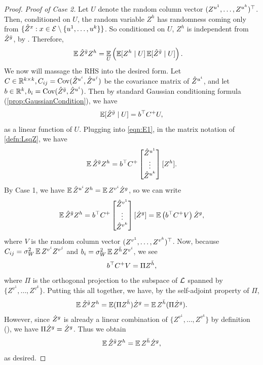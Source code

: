 \documentclass[main.tex]{subfiles}
\begin{document}
\begin{proof}
  \emph{Proof of Case 2.}
  Let $U$ denote the random column vector $(Z^{u^1}, \ldots, Z^{u^k})^\top$.
  Then, conditioned on $U$, the random variable $Z^h$ has randomness coming only from $\{\hat Z^x: x \in \mathcal{E} \setminus \{u^1, \ldots, u^k\}\}$.
  So conditioned on $U$, $Z^h$ is independent from $\hat Z^{\bar g}$, by .
  Therefore,
  \begin{align}
    \EV \Zhat^{\bar g} Z^h
    &=
      \EV_{U}\lp
      \EV [ Z^h \mid U]
      \EV [ \Zhat^{\bar g} \mid U]
      \rp
      .  \label{eqn:E1}
  \end{align}
  We now will massage the RHS into the desired form.
  Let $C \in \mathbb{R}^{k\times k}, C_{ij} = \operatorname{Cov}(\hat Z^{u^i}, \hat Z^{u^j})$ be the covariance matrix of $\hat Z^{u^i}$, and let $b \in \mathbb{R}^k, b_i = \operatorname{Cov}(\hat Z^{\bar g}, \hat Z^{u^i})$.
  Then by standard Gaussian conditioning formula (\cref{prop:GaussianCondition}), we have
  \begin{align*}
    \operatorname*{\mathbb{E}} [ \hat Z^{\bar g} \mid U] = b^\top C^+ U,
  \end{align*}
  as a linear function of $U$.
  Plugging into \cref{eqn:E1}, in the matrix notation of \cref{defn:LsqZ}, we have
  \begin{align*}
    \operatorname*{\mathbb{E}} \hat Z^{\bar g} Z^h = b^\top C^+ 
    \begin{bmatrix}
    \hat Z^{u^1}\\
    \vdots\\
    \hat Z^{u^k}
    \end{bmatrix}
    [Z^{h}]
    .
  \end{align*}
  By Case 1, we have $\operatorname*{\mathbb{E}} \hat Z^{u^{i}} Z^{h} = \operatorname*{\mathbb{E}} Z^{v^{i}} \dot Z^{g}$, so we can write
  \begin{align*}
    \operatorname*{\mathbb{E}} \hat Z^{\bar g} Z^h = b^\top C^+ 
    \begin{bmatrix}
    \hat Z^{v^1}\\
    \vdots\\
    \hat Z^{v^k}
    \end{bmatrix}
    [\dot Z^{g}]
    = \operatorname*{\mathbb{E}} \left( b^\top C^+ V \right) \dot Z^g
    ,
  \end{align*}
  where $V$ is the random column vector $(Z^{v^1}, \ldots, Z^{v^k})^\top$.
  Now, because $C_{ij} = \sigma_W^2 \operatorname*{\mathbb{E}} Z^{v^i} Z^{v^j}$ and $b_i = \sigma_W^2 \operatorname*{\mathbb{E}} Z^{\bar h} Z^{v^i}$, we see
  \[b^\top C^+ V
  = \Pi Z^{\bar h},\]
  where $\Pi$ is the orthogonal projection to the subspace of $\mathcal{L}$ spanned by $\{Z^{v^1}, \ldots, Z^{v^k}\}$.
  Putting this all together, we have, by the self-adjoint property of $\Pi$,
  \begin{align*}
    \operatorname*{\mathbb{E}} \hat Z^{\bar g} Z^h = \operatorname*{\mathbb{E}} (\Pi Z^{\bar h}) \dot Z^g = \operatorname*{\mathbb{E}} Z^{\bar h} (\Pi \dot Z^g).
  \end{align*}
  However, since $\dot Z^g$ is already a linear combination of $\{Z^{v^1}, \ldots, Z^{v^k}\}$ by definition (), we have $\Pi \dot Z^g = \dot Z^g$.
  Thus we obtain
  \begin{align*}
    \operatorname*{\mathbb{E}} \hat Z^{\bar g} Z^h = \operatorname*{\mathbb{E}} Z^{\bar h} \dot Z^g,
  \end{align*}
  as desired.
\end{proof}
\end{document}
